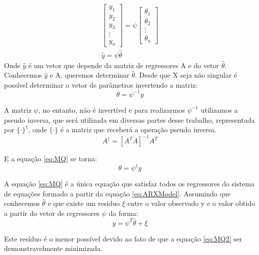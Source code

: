 \begin{equation}
\begin{array}{c}
\begin{bmatrix}
y_1 \\ y_2 \\ y_3\\ \vdots \\ y_n
\end{bmatrix}
=
\psi
\begin{bmatrix}
\theta_1 \\ \theta_2 \\ \vdots \\ \theta_n
\end{bmatrix}
\\
\hat{y}=\psi \hat{\theta}
\end{array}
\end{equation}
Onde $\hat{y}$ é um vetor que depende da matriz de regressores A e do vetor $\hat{\theta}$. Conhecemos $\hat{y}$ e A, queremos determinar $\hat{\theta}$. Desde que X seja não singular é possível determinar o vetor de parâmetros invertendo a matriz:
\begin{equation}\label{eq:MQ}
\theta=\psi^{-1}y
\end{equation}

A matriz $\psi$, no entanto, não é invertível e para realizarmos $\psi^{-1}$ utilizamos a pseudo inversa, que será utilizada em diversas partes desse trabalho, representada por $\{ \cdot\}^\dagger$, onde $\{\cdot\}$ é a matriz que receberá a operação pseudo inversa.
\begin{equation}
A^\dagger=[A^TA]^{-1}A^T
\end{equation}

E a equação \eqref{eq:MQ} se torna:
\begin{equation}\label{eq:MQ2}
\theta=\psi^\dagger y
\end{equation}


A equação \eqref{eq:MQ} é a única equação que satisfaz todos os regressores do sistema de equações formado a partir da equação \eqref{eq:ARXModel}. Assumindo que conhecemos $\hat{\theta}$ e que existe um resíduo $\xi$ entre o valor observado y e o valor obtido a partir do vetor de regressores $\psi$ da forma:
\begin{equation}\label{eq:eMQxi}
y=\psi^T\hat{\theta}+\xi
\end{equation} 

Este resíduo é o menor possível devido ao fato de que a equação \eqref{eq:MQ2} ser demonstravelmente minimizada.


